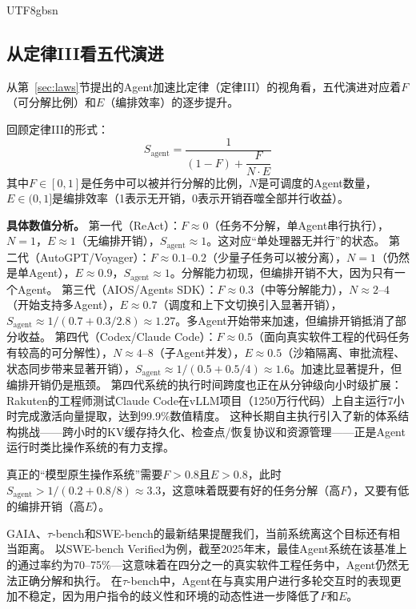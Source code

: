 \documentclass[11pt,a4paper]{article}
\begin{document}
\begin{CJK*}{UTF8}{gbsn}
\subsection*{从定律III看五代演进}

从第~\ref{sec:laws}节提出的Agent加速比定律（定律III）的视角看，五代演进对应着$F$（可分解比例）和$E$（编排效率）的逐步提升。

回顾定律III的形式：
\begin{equation}
\label{eq:agent_law_review}
S_{\mathrm{agent}} = \frac{1}{(1-F) + \dfrac{F}{N \cdot E}}
\end{equation}
其中$F \in [0,1]$是任务中可以被并行分解的比例，$N$是可调度的Agent数量，$E \in (0,1]$是编排效率（1表示无开销，0表示开销吞噬全部并行收益）。

\textbf{具体数值分析。}
第一代（ReAct）：$F \approx 0$（任务不分解，单Agent串行执行），$N=1$，$E \approx 1$（无编排开销），$S_{\mathrm{agent}} \approx 1$。这对应``单处理器无并行''的状态。
第二代（AutoGPT/Voyager）：$F \approx 0.1$--$0.2$（少量子任务可以被分离），$N=1$（仍然是单Agent），$E \approx 0.9$，$S_{\mathrm{agent}} \approx 1$。分解能力初现，但编排开销不大，因为只有一个Agent。
第三代（AIOS/Agents SDK）：$F \approx 0.3$（中等分解能力），$N \approx 2$--$4$（开始支持多Agent），$E \approx 0.7$（调度和上下文切换引入显著开销），$S_{\mathrm{agent}} \approx 1/(0.7 + 0.3/2.8) \approx 1.27$。多Agent开始带来加速，但编排开销抵消了部分收益。
第四代（Codex/Claude Code）：$F \approx 0.5$（面向真实软件工程的代码任务有较高的可分解性），$N \approx 4$--$8$（子Agent并发），$E \approx 0.5$（沙箱隔离、审批流程、状态同步带来显著开销），$S_{\mathrm{agent}} \approx 1/(0.5 + 0.5/4) \approx 1.6$。加速比显著提升，但编排开销仍是瓶颈。
第四代系统的执行时间跨度也正在从分钟级向小时级扩展：Rakuten的工程师测试Claude Code在vLLM项目（1250万行代码）上自主运行7小时完成激活向量提取，达到99.9\%数值精度\cite{anthropic2026agenticreport}。
这种长期自主执行引入了新的体系结构挑战——跨小时的KV缓存持久化、检查点/恢复协议和资源管理——正是Agent运行时类比操作系统的有力支撑。

真正的``模型原生操作系统''需要$F > 0.8$且$E > 0.8$，此时$S_{\mathrm{agent}} > 1/(0.2 + 0.8/8) \approx 3.3$，这意味着既要有好的任务分解（高$F$），又要有低的编排开销（高$E$）。

GAIA\cite{gaia2023}、$\tau$-bench\cite{taubench2024}和SWE-bench\cite{swebench2023}的最新结果提醒我们，当前系统离这个目标还有相当距离。
以SWE-bench Verified为例，截至2025年末，最佳Agent系统在该基准上的通过率约为70--75\%---这意味着在四分之一的真实软件工程任务中，Agent仍然无法正确分解和执行。
在$\tau$-bench中，Agent在与真实用户进行多轮交互时的表现更加不稳定，因为用户指令的歧义性和环境的动态性进一步降低了$F$和$E$。


\end{CJK*}
\end{document}

